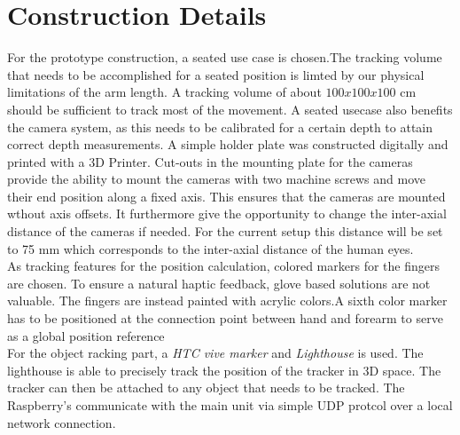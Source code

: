 \section{Construction Details}
For the prototype construction, a seated use case is chosen.The tracking volume that needs to be accomplished for a seated position is limted by our physical limitations of the arm length. A tracking volume of about $100x100x100$ cm should be sufficient to track most of the movement. A seated usecase also benefits the camera system, as this needs to be calibrated for a certain depth to attain correct depth measurements.
A simple holder plate was constructed digitally and printed with a 3D Printer. Cut-outs in the mounting plate for the cameras provide the ability to mount the cameras with two machine screws and move their end position along a fixed axis. This ensures that the cameras are mounted wthout axis offsets. It furthermore give the opportunity to change the inter-axial distance of the cameras if needed. For the current setup this distance will be set to 75 mm which corresponds to the inter-axial distance of the human eyes.\\As tracking features for the position calculation, colored markers for the fingers are chosen. To ensure a natural haptic feedback, glove based solutions are not valuable. The fingers are instead painted with acrylic colors.A sixth color marker has to be positioned at the connection point between hand and forearm to serve as a global position reference
\\For the object racking part, a \textit{HTC vive marker} and \textit{Lighthouse} is used. The lighthouse is able to precisely track the position of the tracker in 3D space. The tracker can then be attached to any object that needs to be tracked.
The Raspberry's communicate with the main unit via simple UDP protcol over a local network connection.
